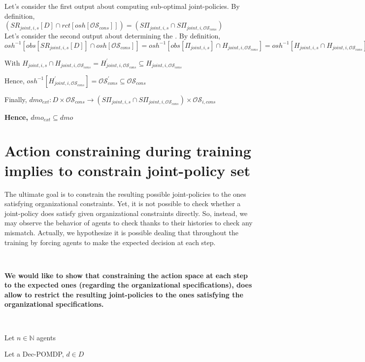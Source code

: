 \documentclass{ecai}
\begin{document}
Let's consider the first output about computing sub-optimal joint-policies.
By definition, $(SR_{joint,i,s}[D] \cap rct[osh[\mathcal{OS}_{cons}]]) = (S\Pi_{joint,i,s} \cap S\Pi_{joint,i,\mathcal{OS}_{cons}})$ \\

Let's consider the second output about determining the .
By definition, $osh^{-1}[obs[SR_{joint,i,s}[D]] \cap osh[\mathcal{OS}_{cons}]] = osh^{-1}[obs[\Pi_{joint,i,s}] \cap H_{joint,i,\mathcal{OS}_{cons}}] = osh^{-1}[H_{joint,i,s} \cap H_{joint,i,\mathcal{OS}_{cons}}]$

With $H_{joint,i,s} \cap H_{joint,i,\mathcal{OS}_{cons}} = H_{joint,i,\mathcal{OS}_{cons}}^{'} \subseteq H_{joint,i,\mathcal{OS}_{cons}}$

Hence, $osh^{-1}[H_{joint,i,\mathcal{OS}_{cons}}^{'}] = \mathcal{OS}_{cons}^{'} \subseteq \mathcal{OS}_{cons}$

Finally, $dmo_{ext}: D \times \mathcal{OS}_{cons} \rightarrow (S\Pi_{joint,i,s} \cap S\Pi_{joint,i,\mathcal{OS}_{cons}}) \times \mathcal{OS}_{i,cons}$

\textbf{Hence, $dmo_{ext} \subseteq dmo$}


\section{Action constraining during training implies to constrain joint-policy set}

    The ultimate goal is to constrain the resulting possible joint-policies to the ones satisfying organizational constraints. Yet, it is not possible to check whether a joint-policy does satisfy given organizational constraints directly.
    So, instead, we may observe the  behavior of agents to check thanks to their histories to check any mismatch. Actually, we hypothesize it is possible dealing that  throughout the training by forcing agents to make the expected decision at each step.

    \

    \textbf{We would like to show that constraining the action space at each step to the expected ones (regarding the organizational specifications), does allow to restrict the resulting joint-policies to the ones satisfying the organizational specifications.}

    \
    
    Let $n \in \mathbb{N}$ agents
    
    Let a Dec-POMDP, $d \in D$
    
\end{document}
